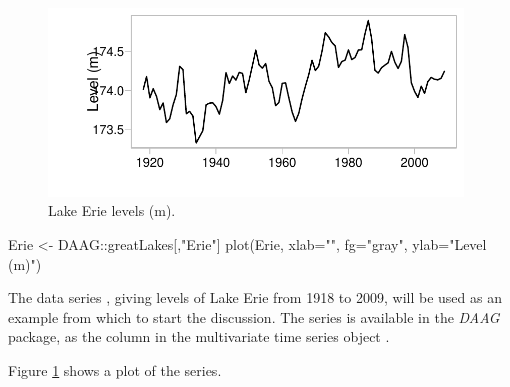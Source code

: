 \begin{figure}
\begin{Schunk}


\centerline{\includegraphics[width=0.98\textwidth]{figs/9-Erie1-1} }

\end{Schunk}
\caption{Lake Erie levels (m).
}\label{fig:erie}
\end{figure}
\begin{marginfigure}[-7cm]
\begin{Schunk}
\begin{Sinput}
Erie <- DAAG::greatLakes[,"Erie"]
plot(Erie, xlab="", fg="gray",
     ylab="Level (m)")
\end{Sinput}
\end{Schunk}
\end{marginfigure}

The data series , giving levels of Lake Erie
from 1918 to 2009, will be used as an example from which
to start the discussion.
    The series is available in the
    \textit{DAAG} package, as the column  in the
    multivariate time series object .

Figure \ref{fig:erie} shows a plot of the series.

